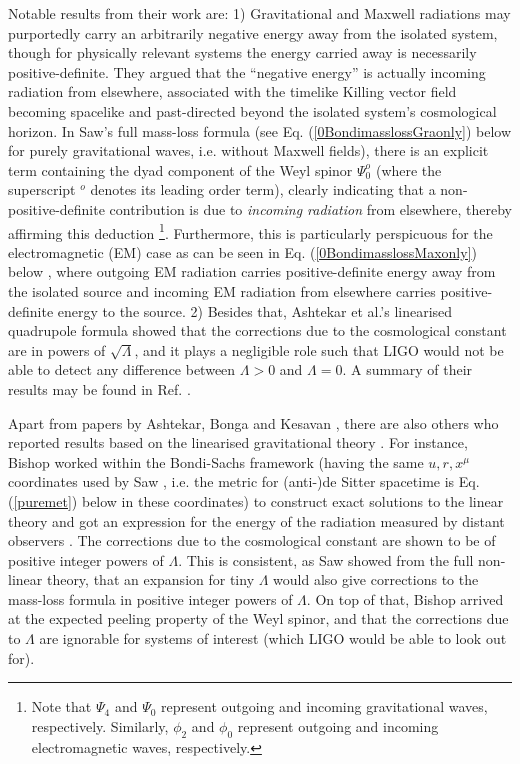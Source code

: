 \documentclass[aps,pre,preprint,superscriptaddress,showpacs,showkeys]{revtex4-1}
\begin{document}
Notable results from their work are: 1) Gravitational and Maxwell radiations may purportedly carry an arbitrarily negative energy away from the isolated system, though for physically relevant systems the energy carried away is necessarily positive-definite. They argued that the ``negative energy'' is actually incoming radiation from elsewhere, associated with the timelike Killing vector field becoming spacelike and past-directed beyond the isolated system's cosmological horizon. In Saw's full mass-loss formula \cite{Vee2016} (see Eq. (\ref{0BondimasslossGraonly}) below for purely gravitational waves, i.e. without Maxwell fields), there is an explicit term containing the dyad component of the Weyl spinor $\Psi^o_0$ (where the superscript $^o$ denotes its leading order term), clearly indicating that a non-positive-definite contribution is due to \emph{incoming radiation} from elsewhere, thereby affirming this deduction \footnote{Note that $\Psi_4$ and $\Psi_0$ represent outgoing and incoming gravitational waves, respectively. Similarly, $\phi_2$ and $\phi_0$ represent outgoing and incoming electromagnetic waves, respectively.}. Furthermore, this is particularly perspicuous for the electromagnetic (EM) case as can be seen in Eq. (\ref{0BondimasslossMaxonly}) below \cite{Vee2017}, where outgoing EM radiation carries positive-definite energy away from the isolated source and incoming EM radiation from elsewhere carries positive-definite energy to the source. 2) Besides that, Ashtekar et al.'s linearised quadrupole formula showed that the corrections due to the cosmological constant are in powers of $\sqrt{\Lambda}$, and it plays a negligible role such that LIGO would not be able to detect any difference between $\Lambda>0$ and $\Lambda=0$. A summary of their results may be found in Ref. \cite{ash4}.

Apart from papers by Ashtekar, Bonga and Kesavan \cite{ash2,ash3}, there are also others who reported results based on the linearised gravitational theory \cite{gracos1,gracos2}. For instance, Bishop worked within the Bondi-Sachs framework (having the same $u,r,x^\mu$ coordinates used by Saw \cite{Vee2016}, i.e. the metric for (anti-)de Sitter spacetime is Eq. (\ref{puremet}) below in these coordinates) to construct exact solutions to the linear theory and got an expression for the energy of the radiation measured by distant observers \cite{gracos1}. The corrections due to the cosmological constant are shown to be of positive integer powers of $\Lambda$. This is consistent, as Saw showed from the full non-linear theory, that an expansion for tiny $\Lambda$ would also give corrections to the mass-loss formula in positive integer powers of $\Lambda$. On top of that, Bishop arrived at the expected peeling property of the Weyl spinor, and that the corrections due to $\Lambda$ are ignorable for systems of interest (which LIGO would be able to look out for).
\end{document}
